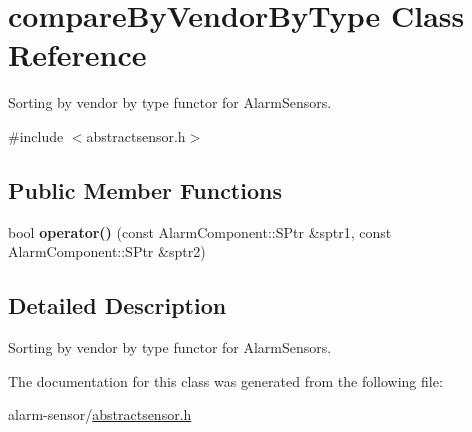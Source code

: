 \hypertarget{classcompareByVendorByType}{}\section{compare\+By\+Vendor\+By\+Type Class Reference}
\label{classcompareByVendorByType}


Sorting by vendor by type functor for Alarm\+Sensors.  




{\ttfamily \#include $<$abstractsensor.\+h$>$}

\subsection*{Public Member Functions}
\begin{DoxyCompactItemize}
\item 
bool {\bfseries operator()} (const Alarm\+Component\+::\+S\+Ptr \&sptr1, const Alarm\+Component\+::\+S\+Ptr \&sptr2)\hypertarget{classcompareByVendorByType_a89e0ddac8ee1707d6efb2f44bb654465}{}\label{classcompareByVendorByType_a89e0ddac8ee1707d6efb2f44bb654465}

\end{DoxyCompactItemize}


\subsection{Detailed Description}
Sorting by vendor by type functor for Alarm\+Sensors. 

The documentation for this class was generated from the following file\+:\begin{DoxyCompactItemize}
\item 
alarm-\/sensor/\hyperlink{abstractsensor_8h}{abstractsensor.\+h}\end{DoxyCompactItemize}
